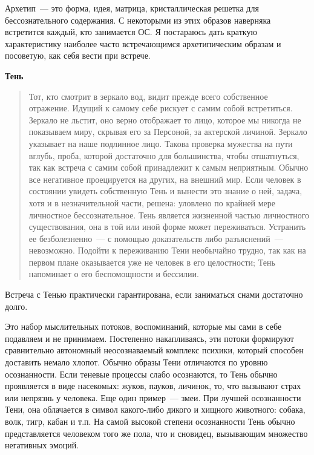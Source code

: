 \documentclass[a5paper,12pt,twoside]{memoir}
\begin{document}
Архетип~--- это форма, идея, матрица, кристаллическая решетка для бессознательного содержания. С некоторыми из этих образов наверняка встретится каждый, кто занимается ОС. Я постараюсь дать краткую характеристику наиболее часто встречающимся архетипическим образам и посоветую, как себя вести при встрече.

\begin{center}
\bfseries{Тень} 
\end{center}


\begin{quotation}
Тот, кто смотрит в зеркало вод, видит прежде всего собственное отражение. Идущий к самому себе рискует с самим собой встретиться. Зеркало не льстит, оно верно отображает то лицо, которое мы никогда не показываем миру, скрывая его за Персоной, за актерской личиной. Зеркало указывает на наше подлинное лицо. Такова проверка мужества на пути вглубь, проба, которой достаточно для большинства, чтобы отшатнуться, так как встреча с самим собой принадлежит к самым неприятным. Обычно все негативное проецируется на других, на внешний мир. Если человек в состоянии увидеть собственную Тень и вынести это знание о ней, задача, хотя и в незначительной части, решена: уловлено по крайней мере личностное бессознательное. Тень является жизненной частью личностного существования, она в той или иной форме может переживаться. Устранить ее безболезненно~--- с помощью доказательств либо разъяснений~--- невозможно. Подойти к переживанию Тени необычайно трудно, так как на первом плане оказывается уже не человек в его целостности; Тень напоминает о его беспомощности и бессилии. 
\end{quotation}


Встреча с Тенью практически гарантирована, если заниматься снами достаточно долго.

Это набор мыслительных потоков, воспоминаний, которые мы сами в себе подавляем и не принимаем. Постепенно накапливаясь, эти потоки формируют сравнительно автономный неосознаваемый комплекс психики, который способен доставить немало хлопот. Обычно образы Тени отличаются по уровню осознанности. Если теневые процессы слабо осознаются, то Тень обычно проявляется в виде насекомых: жуков, пауков, личинок, то, что вызывают страх или непрязнь у человека. Еще один пример~--- змеи. При лучшей осознанности Тени, она облачается в символ какого-либо дикого и хищного животного: собака, волк, тигр, кабан и т.п. На самой высокой степени осознанности Тень обычно представляется человеком того же пола, что и сновидец, вызывающим множество негативных эмоций.
\end{document}
